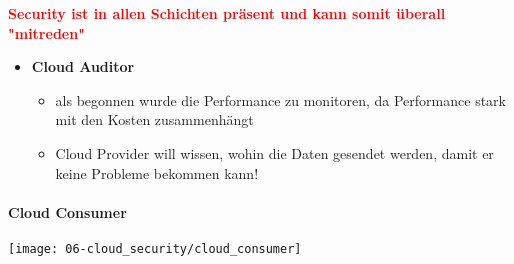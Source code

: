 \textcolor{red}{\textbf{Security ist in allen Schichten präsent und kann somit überall "mitreden"}}\\

\begin{itemize}
    \item \textbf{Cloud Auditor}
    \begin{itemize}
        \item als begonnen wurde die Performance zu monitoren, da Performance stark mit den Kosten zusammenhängt
        \item Cloud Provider will wissen, wohin die Daten gesendet werden, damit er keine Probleme bekommen kann!
    \end{itemize}
\end{itemize}

\paragraph{Cloud Consumer}
\begin{center}
    \texttt{[image: 06-cloud\_security/cloud\_consumer]}
    \vspace{-8pt}
\end{center}

\newpage

